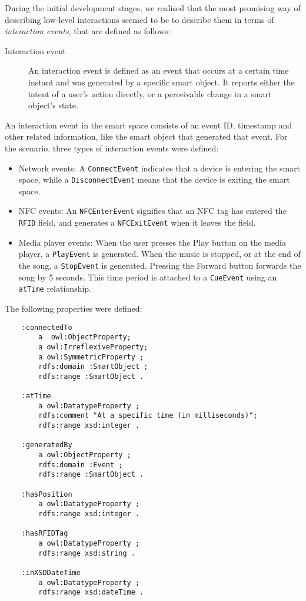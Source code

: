 During the initial development stages, we realised that the most promising way of describing low-level interactions seemed to be to describe them in terms of \emph{interaction events}, that are defined as follows:

\begin{description}
	\item [Interaction event] An interaction event is defined as an event that occurs at a certain time instant and was generated by a specific smart object. It reports either the intent of a user's action directly, or a perceivable change in a smart object's state.
\end{description}

An interaction event in the smart space consists of an event ID, timestamp and other related information, like the smart object that generated that event. For the scenario, three types of interaction events were defined:

\begin{itemize}
	\item Network events: A \texttt{ConnectEvent} indicates that a device is entering the smart space, while a \texttt{DisconnectEvent} means that the device is exiting the smart space. 
	\item \ac{NFC} events: An \texttt{NFCEnterEvent} signifies that an \ac{NFC} tag has entered the \texttt{RFID} field, and generates a \texttt{NFCExitEvent} when it leaves the field.
	\item Media player events: When the user presses the Play button on the media player, a \texttt{PlayEvent} is generated. When the music is stopped, or at the end of the song, a \texttt{StopEvent} is generated. Pressing the Forward button forwards the song by 5 seconds. This time period is attached to a \texttt{CueEvent} using an \texttt{atTime} relationship.
\end{itemize}

The following properties were defined:

\begin{verbatim}
	:connectedTo
		a  owl:ObjectProperty;
	    a owl:IrreflexiveProperty;
		a owl:SymmetricProperty ;
	    rdfs:domain :SmartObject ;
	    rdfs:range :SmartObject .

	:atTime
	    a owl:DatatypeProperty ;
	    rdfs:comment "At a specific time (in milliseconds)";
	    rdfs:range xsd:integer .

	:generatedBy
	    a owl:ObjectProperty ;
	    rdfs:domain :Event ;
	    rdfs:range :SmartObject .

	:hasPosition
	    a owl:DatatypeProperty ;
	    rdfs:range xsd:integer .

	:hasRFIDTag
	    a owl:DatatypeProperty ;
	    rdfs:range xsd:string .

	:inXSDDateTime
	    a owl:DatatypeProperty ;
	    rdfs:range xsd:dateTime .
\end{verbatim}


